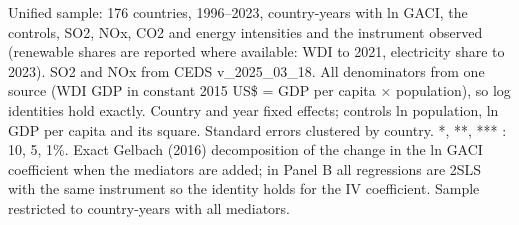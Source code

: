 \begin{table}[htbp]
\begin{minipage}{0.95\textwidth}\footnotesize Unified sample: 176 countries, 1996--2023, country-years with ln GACI, the controls, SO2, NOx, CO2 and energy intensities and the instrument observed (renewable shares are reported where available: WDI to 2021, electricity share to 2023). SO2 and NOx from CEDS v\_2025\_03\_18. All denominators from one source (WDI GDP in constant 2015 US\$ = GDP per capita $\times$ population), so log identities hold exactly. Country and year fixed effects; controls ln population, ln GDP per capita and its square. Standard errors clustered by country. *, **, *** : 10, 5, 1\%. Exact Gelbach (2016) decomposition of the change in the ln GACI coefficient when the mediators are added; in Panel B all regressions are 2SLS with the same instrument so the identity holds for the IV coefficient. Sample restricted to country-years with all mediators.\end{minipage}
\end{table}
